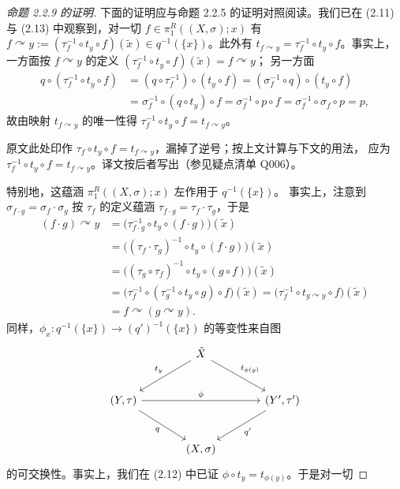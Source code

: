 \begin{proof}[命题 2.2.9 的证明]
下面的证明应与命题 2.2.5 的证明对照阅读。我们已在 (2.11) 与 (2.13) 中观察到，对一切
$f\in\pi^R_1((X,\sigma);x)$ 有
$f\curvearrowright y:=(\tau_f^{-1}\circ t_y\circ f)(\tilde x)\in q^{-1}(\{x\})$。此外有
$t_{f\curvearrowright y}=\tau_f^{-1}\circ t_y\circ f$。事实上，一方面按
$f\curvearrowright y$ 的定义 $(\tau_f^{-1}\circ t_y\circ f)(\tilde x)=f\curvearrowright y$；
另一方面
\[
\begin{aligned}
q\circ(\tau_f^{-1}\circ t_y\circ f)
&=(q\circ\tau_f^{-1})\circ(t_y\circ f)
=(\sigma_f^{-1}\circ q)\circ(t_y\circ f)\\
&=\sigma_f^{-1}\circ(q\circ t_y)\circ f
=\sigma_f^{-1}\circ p\circ f
=\sigma_f^{-1}\circ\sigma_f\circ p=p,
\end{aligned}
\]
故由映射 $t_{f\curvearrowright y}$ 的唯一性得
$\tau_f^{-1}\circ t_y\circ f=t_{f\curvearrowright y}$。\begin{annote}原文此处印作
$\tau_f\circ t_y\circ f=t_{f\curvearrowright y}$，漏掉了逆号；按上文计算与下文的用法，
应为 $\tau_f^{-1}\circ t_y\circ f=t_{f\curvearrowright y}$。译文按后者写出（参见疑点清单
Q006）。\end{annote}特别地，这蕴涵 $\pi^R_1((X,\sigma);x)$ 左作用于 $q^{-1}(\{x\})$。
事实上，注意到 $\sigma_{f\cdot g}=\sigma_f\cdot\sigma_g$ 按 $\tau_f$ 的定义蕴涵
$\tau_{f\cdot g}=\tau_f\cdot\tau_g$，于是
\[
\begin{aligned}
(f\cdot g)\curvearrowright y
&=\bigl(\tau_{f\cdot g}^{-1}\circ t_y\circ(f\cdot g)\bigr)(\tilde x)\\
&=\bigl((\tau_f\cdot\tau_g)^{-1}\circ t_y\circ(f\cdot g)\bigr)(\tilde x)\\
&=\bigl((\tau_g\circ\tau_f)^{-1}\circ t_y\circ(g\circ f)\bigr)(\tilde x)\\
&=\bigl(\tau_f^{-1}\circ(\tau_g^{-1}\circ t_y\circ g)\circ f\bigr)(\tilde x)
=\bigl(\tau_f^{-1}\circ t_{g\curvearrowright y}\circ f\bigr)(\tilde x)\\
&=f\curvearrowright(g\curvearrowright y).
\end{aligned}
\]
同样，$\phi_x:q^{-1}(\{x\})\to(q')^{-1}(\{x\})$ 的等变性来自图
\[
\begin{tikzcd}[column sep=large, row sep=large]
 & \tilde X \arrow[dl, "t_y"'] \arrow[dr, "t_{\phi(y)}"] & \\
 (Y,\tau) \arrow[dr, "q"'] \arrow[rr, "\phi"] & & (Y',\tau') \arrow[dl, "q'"]\\
 & (X,\sigma) &
\end{tikzcd}
\]
的可交换性。事实上，我们在 (2.12) 中已证 $\phi\circ t_y=t_{\phi(y)}$。于是对一切

\end{proof}
